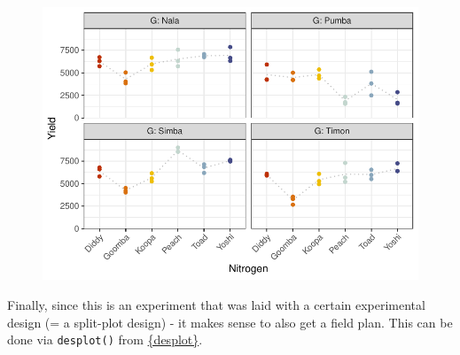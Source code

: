 \documentclass[
  letterpaper,
  DIV=11,
  numbers=noendperiod]{scrartcl}
\begin{document}
\begin{figure}[H]

{\centering \includegraphics{splitplot_gomezgomez1984_files/figure-pdf/unnamed-chunk-9-1.pdf}

}

\end{figure}

Finally, since this is an experiment that was laid with a certain
experimental design (= a split-plot design) - it makes sense to also get
a field plan. This can be done via \texttt{desplot()} from
\href{../../summaryarticles/usefulthings.qmd\#desplot}{\{desplot\}}.
\end{document}
